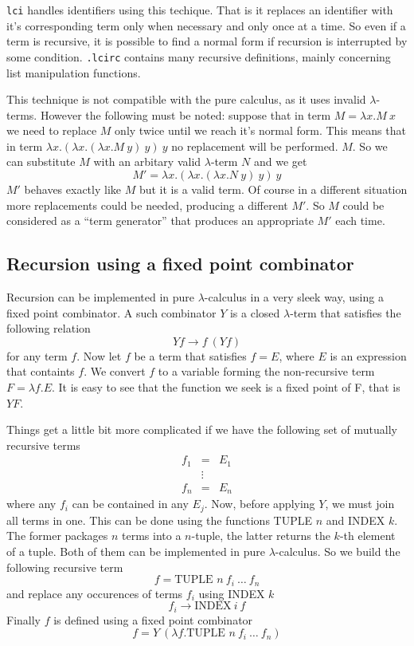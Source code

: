 \documentclass[a4paper,11pt]{article}
\newcommand{\la}{$\lambda$}
\newcommand{\lci}{\texttt{lci}}
\newcommand{\lc}{$\lambda$-calculus}
\newcommand{\qm}[1]{``#1''}
\newcommand{\kwd}[1]{\texttt{#1}}
\newcommand{\en}[1]{#1}
\begin{document}
\lci{} handles identifiers using this techique. That is it replaces an identifier
with it's corresponding term only when necessary and only once at a time. So even
if a term is recursive, it is possible to find a normal form if recursion is
interrupted by some condition. \kwd{.lcirc} contains many recursive definitions,
mainly concerning list manipulation functions.

This technique is not compatible with the pure calculus, as it uses invalid
\la-terms. However the following must be noted: suppose that in term
$M = \lambda x.M\ x$ we need to replace $M$ only twice until we reach it's normal
form. This means that in term $ \lambda x.(\lambda x.(\lambda x.M\ y)\ y)\ y $
no replacement will be performed. $M$. So we can substitute $M$ with an arbitary
valid \la-term $N$ and we get
\[ M' = \lambda x.(\lambda x.(\lambda x.N\ y)\ y)\ y \]
$M'$ behaves exactly like $M$ but it is a valid term. Of course in a different
situation more replacements could be needed, producing a different $M'$. So $M$
could be considered as a \qm{term generator} that produces an appropriate $M'$
each time.

\subsection{Recursion using a fixed point combinator}
\label{par_recfp}
Recursion can be implemented in pure \la-calculus in a very sleek way, using a
fixed point combinator. A such combinator $Y$ is a closed \la-term that
satisfies the following relation
\[ Y f \rightarrow f\ (Y f) \]
for any term $f$. Now let $f$ be a term that satisfies $f=E$, where $E$ is
an expression that containts $f$. We convert $f$ to a variable forming the
non-recursive term $F = \lambda f.E$. It is easy to see that the function we seek
is a fixed point of F, that is $Y F$.

Things get a little bit more complicated if we have the following set of mutually
recursive terms
\begin{eqnarray*}
	f_1 & = & E_1 \\
	& \vdots \\
	f_n & = & E_n
\end{eqnarray*}
where any $f_i$ can be contained in any $E_j$. Now, before applying $Y$, we must
join all terms in one. This can be done using the functions TUPLE $n$ and INDEX $k$.
The former packages $n$ terms into a $n$-tuple, the latter returns the $k$-th
element of a tuple. Both of them can be implemented in pure \lc. So we build
the following recursive term
\[ f = \textrm{\en{TUPLE }} n\ f_i \ \dots\ f_n \]
and replace any occurences of terms $f_i$ using INDEX $k$
\[ f_i \rightarrow \textrm{\en{INDEX}}\ i\ f \]
Finally $f$ is defined using a fixed point combinator
\[ f = Y\ (\lambda f.\textrm{\en{TUPLE }} n\ f_i \ \dots\ f_n ) \]
\end{document}
